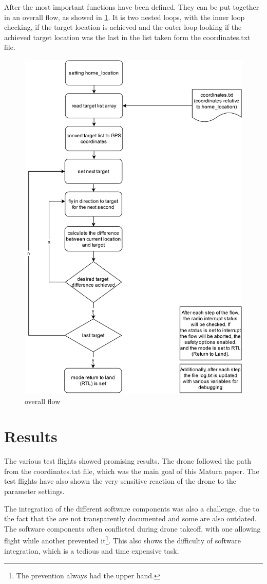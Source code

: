 \documentclass[svgnames]{article}
\begin{document}
	After the most important functions have been defined. They can be put together in an overall flow, as showed in \cref{fig:pythonflow}. It is two nested loops, with the inner loop checking, if the target location is achieved and the outer loop looking if the achieved target location was the last in the list taken form the coordinates.txt file.
		\newpage
\begin{figure}[ht]
	\centering
	\includegraphics[width=0.7\linewidth]{pictures/pythonflow}
	\caption{overall flow}
	\label{fig:pythonflow}
\end{figure}

	\section{Results}

	The various test flights showed promising results. The drone followed the path from the coordinates.txt file, which was the main goal of this Matura paper. The test flights have also shown the very sensitive reaction of the drone to the parameter settings. 
	
	The integration of the different software components was also a challenge, due to the fact that the  are not transparently documented and some are also outdated. The software components often conflicted during drone takeoff, with one allowing flight while another prevented it\footnote{The prevention always had the upper hand.}. This also shows the difficulty of software integration, which is a tedious and time expensive task.
\end{document}
